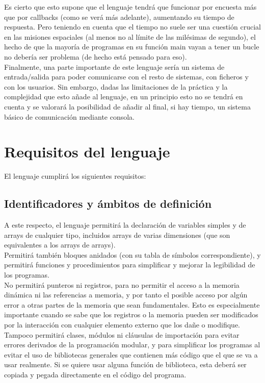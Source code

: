 \documentclass[a4paper, 12pt]{article}
\begin{document}
Es cierto que esto supone que el lenguaje tendrá que funcionar por encuesta más que por callbacks (como se verá más adelante), aumentando su tiempo de respuesta. Pero teniendo en cuenta que el tiempo no suele ser una cuestión crucial en las misiones espaciales (al menos no al límite de las milésimas de segundo), el hecho de que la mayoría de programas en su función main vayan a tener un bucle no debería ser problema (de hecho está pensado para eso).\\

Finalmente, una parte importante de este lenguaje sería un sistema de entrada/salida para poder comunicarse con el resto de sistemas, con ficheros y con los usuarios. Sin embargo, dadas las limitaciones de la práctica y la complejidad que esto añade al lenguaje, en un principio esto no se tendrá en cuenta y se valorará la posibilidad de añadir al final, si hay tiempo, un sistema básico de comunicación mediante consola.
\newpage

\section{Requisitos del lenguaje}
El lenguaje cumplirá los siguientes requisitos:
\subsection{Identificadores y ámbitos de definición}
A este respecto, el lenguaje permitirá la declaración de variables simples y de arrays de cualquier tipo, incluidos arrays de varias dimensiones (que son equivalentes a los arrays de arrays).\\

Permitirá también bloques anidados (con su tabla de símbolos correspondiente), y permitirá funciones y procedimientos para simplificar y mejorar la legibilidad de los programas.\\

No permitirá punteros ni registros, para no permitir el acceso a la memoria dinámica ni las referencias a memoria, y por tanto el posible acceso por algún error a otras partes de la memoria que sean fundamentales. Esto es especialmente importante cuando se sabe que los registros o la memoria pueden ser modificados por la interacción con cualquier elemento externo que los dañe o modifique.\\

Tampoco permitirá clases, módulos ni cláusulas de importación para evitar errores derivados de la programación modular, y para simplificar los programas al evitar el uso de bibliotecas generales que contienen más código que el que se va a usar realmente. Si se quiere usar alguna función de biblioteca, esta deberá ser copiada y pegada directamente en el código del programa.
\end{document}
